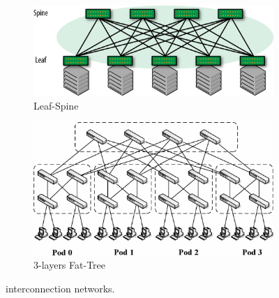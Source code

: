 \begin{figure}
	\centering
	\begin{subfigure}[b]{0.45\textwidth}
		\centering
		\includegraphics[width=\textwidth]{Chapter1/Figures/leaf-spine}
		\caption{Leaf-Spine}
		\label{fig:leafspine}
	\end{subfigure}
	\hfill
	\begin{subfigure}[b]{0.45\textwidth}
		\centering
		\includegraphics[width=\textwidth]{Chapter1/Figures/fat-tree}
		\caption{3-layers Fat-Tree}
		\label{fig:fattree}
	\end{subfigure}
	\caption{interconnection networks.}
	\label{fig:topology}
\end{figure}

